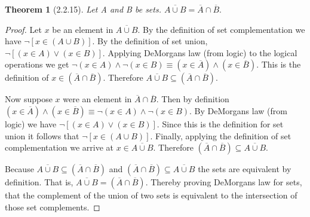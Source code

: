 \documentclass[a4paper, 12pt]{article}
\theoremstyle{plain}
\newtheorem*{theorem*}{Theorem}
\begin{document}
	
	\begin{theorem*}[2.2.15]
		Let A and B be sets. $\overline{A \cup B} = \overline{A} \cap \overline{B}.$
	\end{theorem*}
	
	\begin{proof}
		Let $x$ be an element in $\overline{A \cup B}$. By the definition of set \newline complementation we 
		have $\lnot [x \in (A \cup B)]$. By the definition of set union, \newline 
		$\lnot [(x \in A) \lor (x \in B)]$. Applying DeMorgans law (from logic) to the logical operations we 
		get $\lnot(x \in A) \land \lnot(x \in B) \equiv (x \in \overline{A}) \land (x \in \overline{B})$. 
		This is the definition of $x \in (\overline{A} \cap \overline{B})$. Therefore 
		$\overline{A \cup B} \subseteq (\overline{A} \cap \overline{B})$. 
		
		Now suppose $x$ were an element in $\overline{A} \cap \overline{B}$. Then by definition \newline 
		$(x \in \overline{A}) \land (x \in \overline{B}) \equiv \lnot (x \in A) \land \lnot (x \in B)$. 
		By DeMorgans law (from logic) we have $\lnot [(x \in A) \lor (x \in B)]$. Since this is the 
		definition for set union it follows that $\lnot [x \in (A \cup B)]$. Finally, applying the definition 
		of set complementation we arrive at $x \in \overline{A \cup B}$. Therefore 
		$(\overline{A} \cap \overline{B}) \subseteq \overline{A \cup B}$.
		
		Because $\overline{A \cup B} \subseteq (\overline{A} \cap \overline{B})$ and 
		$(\overline{A} \cap \overline{B}) \subseteq \overline{A \cup B}$ the sets are equivalent by definition. 
		That is,  $\overline{A \cup B} = (\overline{A} \cap \overline{B})$. Thereby proving DeMorgans law for sets, 
		that the complement of the union of two sets is equivalent to the intersection of those set complements.		
	\end{proof}
\end{document}
